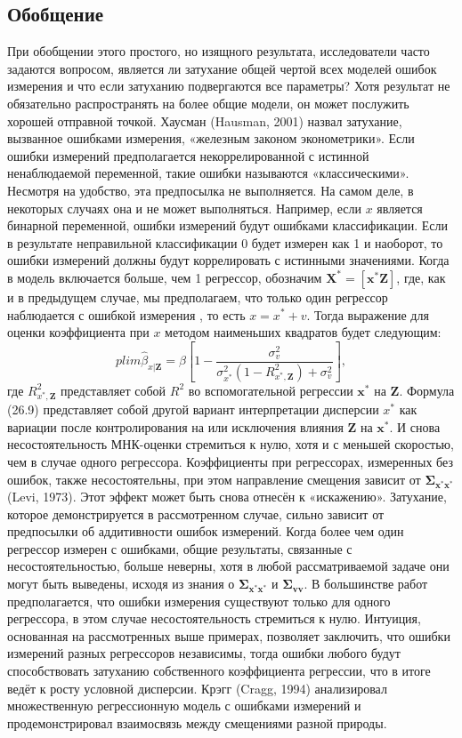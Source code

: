 \subsection{Обобщение} 
При обобщении этого простого, но изящного результата, исследователи часто задаются вопросом, является ли затухание общей чертой всех моделей ошибок измерения и что если затуханию подвергаются все параметры? Хотя результат не обязательно распространять на более общие модели, он может послужить хорошей отправной точкой. Хаусман (Hausman, 2001) назвал затухание, вызванное ошибками измерения, «железным законом эконометрики». 
Если ошибки измерений предполагается некоррелированной с истинной ненаблюдаемой переменной, такие ошибки называются «классическими». Несмотря на удобство, эта предпосылка не выполняется. На самом деле, в некоторых случаях она и не может выполняться. Например, если $x$ является бинарной переменной, ошибки измерений будут ошибками классификации. Если в результате неправильной классификации 0 будет измерен как 1 и наоборот, то ошибки измерений должны будут коррелировать с истинными значениями.
Когда в модель включается больше, чем 1 регрессор, обозначим $\mathbf{X^*}=[\mathbf{x^* Z}]$, где, как и в предыдущем случае, мы предполагаем, что только один регрессор наблюдается с ошибкой измерения , то есть $x=x^*+v$. Тогда выражение для оценки коэффициента при $x$ методом наименьших квадратов будет следующим:
\begin{equation}
plim\widehat{\beta}_{x|\mathbf{Z}}=\beta \left[ 1-\frac{\sigma^2_v}{\sigma^2_{x^*}(1-R^2_{x^*,\mathbf{Z}})+\sigma^2_v}\right],
\end{equation}
где $R^2_{x^*,\mathbf{Z}}$ представляет собой $R^2$ во вспомогательной регрессии $\mathbf{x^*}$ на $\mathbf{Z}$. Формула (26.9) представляет собой другой вариант интерпретации  дисперсии $x^*$ как вариации после контролирования на или исключения влияния $\mathbf{Z}$ на $\mathbf{x^*}$. И снова несостоятельность МНК-оценки стремиться к нулю, хотя и с меньшей скоростью, чем в случае одного регрессора. Коэффициенты при регрессорах, измеренных без ошибок, также несостоятельны, при этом направление смещения зависит от $\mathbf{\Sigma_{x^*x^*}}$ (Levi, 1973). Этот эффект может быть снова отнесён к «искажению». Затухание, которое демонстрируется в рассмотренном случае, сильно зависит от предпосылки об аддитивности ошибок измерений. 
Когда более чем один регрессор измерен с ошибками, общие результаты, связанные с несостоятельностью, больше неверны, хотя в любой рассматриваемой задаче они могут быть выведены, исходя из знания о $\mathbf{\Sigma_{x^*x^*}}$ и $\mathbf{\Sigma_{vv}}$. В большинстве работ предполагается, что ошибки измерения существуют только для одного регрессора, в этом случае несостоятельность стремиться к нулю. Интуиция, основанная на рассмотренных выше примерах, позволяет заключить, что ошибки измерений разных регрессоров независимы, тогда ошибки любого будут способствовать затуханию собственного коэффициента регрессии, что в итоге ведёт к росту условной дисперсии. Крэгг (Cragg, 1994) анализировал множественную регрессионную модель с ошибками измерений и продемонстрировал взаимосвязь между смещениями разной природы.

